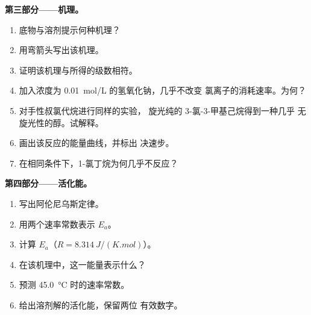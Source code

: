 \begin{problem}
\medskip
\noindent\textbf{第三部分——机理。}
\begin{enumerate}[resume]
  \item 底物与溶剂提示何种机理？
  \item 用弯箭头写出该机理。
  \item 证明该机理与所得的级数相符。
  \item 加入浓度为 \qty{0.01}{mol/L} 的氢氧化钠，几乎不改变
        氯离子的消耗速率。为何？
  \item 对手性叔氯代烷进行同样的实验，
        旋光纯的 3-氯-3-甲基己烷得到一种几乎
        无旋光性的醇。试解释。
  \item 画出该反应的能量曲线，并标出
        决速步。
  \item 在相同条件下，1-氯丁烷为何几乎不反应？
\end{enumerate}

\medskip
\noindent\textbf{第四部分——活化能。}
\begin{enumerate}[resume]
  \item 写出阿伦尼乌斯定律。
  \item 用两个速率常数表示 $E_a$。
  \item 计算 $E_a$（$R = \qty{8.314}{J/(K.mol)}$）。
  \item 在该机理中，这一能量表示什么？
  \item 预测 \qty{45.0}{\celsius} 时的速率常数。
  \item 给出溶剂解的活化能，保留两位
        有效数字。
\end{enumerate}
\end{problem}

